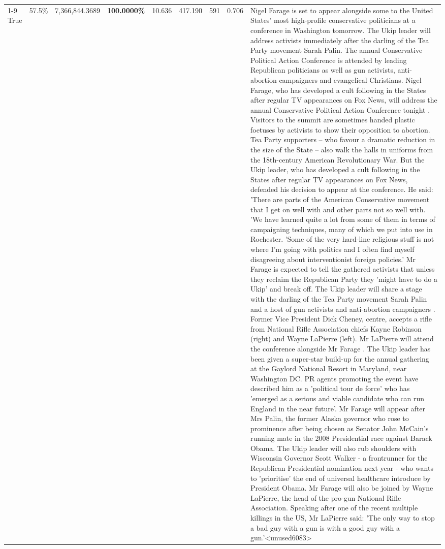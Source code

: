 \begin{table}[H]
\begin{tabular}{lllrlllll}
\cline{1-9}
True & 57.5\% & 7,366,844.3689 & \bfseries \color{red} 100.0000\% & 10.636 & 417.190 & 591 & 0.706 & Nigel Farage is set to appear alongside some to the United States' most high-profile conservative politicians at a conference in Washington tomorrow. The Ukip leader will address activists immediately after the darling of the Tea Party movement Sarah Palin. The annual Conservative Political Action Conference is attended by leading Republican politicians as well as gun activists, anti-abortion campaigners and evangelical Christians. Nigel Farage, who has developed a cult following in the States after regular TV appearances on Fox News, will address the annual Conservative Political Action Conference tonight . Visitors to the summit are sometimes handed plastic foetuses by activists to show their opposition to abortion. Tea Party supporters – who favour a dramatic reduction in the size of the State – also walk the halls in uniforms from the 18th-century American Revolutionary War. But the Ukip leader, who has developed a cult following in the States after regular TV appearances on Fox News, defended his decision to appear at the conference. He said: 'There are parts of the American Conservative movement that I get on well with and other parts not so well with. 'We have learned quite a lot from some of them in terms of campaigning techniques, many of which we put into use in Rochester. 'Some of the very hard-line religious stuff is not where I'm going with politics and I often find myself disagreeing about interventionist foreign policies.' Mr Farage is expected to tell the gathered activists that unless they reclaim the Republican Party they 'might have to do a Ukip' and break off. The Ukip leader will share a stage with the darling of the Tea Party movement Sarah Palin and a host of gun activists and anti-abortion campaigners . Former Vice President Dick Cheney, centre, accepts a rifle from National Rifle Association chiefs Kayne Robinson (right) and Wayne LaPierre (left). Mr LaPierre will attend the conference alongside Mr Farage . The Ukip leader has been given a super-star build-up for the annual gathering at the Gaylord National Resort in Maryland, near Washington DC. PR agents promoting the event have described him as a 'political tour de force' who has 'emerged as a serious and viable candidate who can run England in the near future'. Mr Farage will appear after Mrs Palin, the former Alaska governor who rose to prominence after being chosen as Senator John McCain's running mate in the 2008 Presidential race against Barack Obama. The Ukip leader will also rub shoulders with Wisconsin Governor Scott Walker - a frontrunner for the Republican Presidential nomination next year - who wants to 'prioritise' the end of universal healthcare introduce by President Obama. Mr Farage will also be joined by Wayne LaPierre, the head of the pro-gun National Rifle Association. Speaking after one of the recent multiple killings in the US, Mr LaPierre said: 'The only way to stop a bad guy with a gun is with a good guy with a gun.'<unused6083> \\

\end{tabular}
\end{table}
